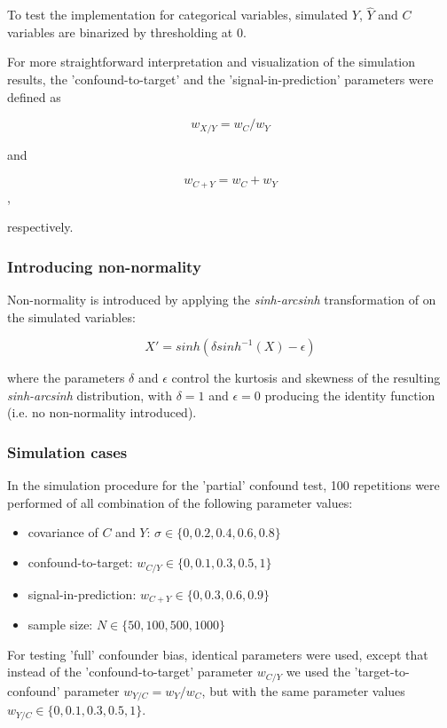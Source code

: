 \documentclass{article}
\begin{document}
To test the implementation for categorical variables, simulated $Y$, $\hat{Y}$ and $C$ variables are binarized by thresholding at 0.

For more straightforward interpretation and visualization of the simulation results, the 'confound-to-target' and the 'signal-in-prediction' parameters were defined as

$$ w_{X/Y} = w_C / w_Y $$

and

$$ w_{C+Y} = w_C + w_Y $$,

respectively.

\subsubsection*{Introducing non-normality}

Non-normality is introduced by applying the \emph{sinh-arcsinh} transformation of \cite{jones2009sinh} on the simulated variables:

$$X' = sinh(\delta sinh^{-1}(X) - \epsilon)$$

where the parameters $\delta$ and $\epsilon$ control the kurtosis and skewness of the resulting \emph{sinh-arcsinh} distribution, with $\delta=1$ and $\epsilon=0$ producing the identity function (i.e. no non-normality introduced).

\subsubsection*{Simulation cases}

In the simulation procedure for the 'partial' confound test, 100 repetitions were performed of all combination of the following parameter values: 
\begin{itemize}
    \item covariance of $C$ and $Y$: $\sigma \in \{0, 0.2, 0.4, 0.6, 0.8\}$
    \item confound-to-target: $w_{C/Y} \in \{0, 0.1, 0.3, 0.5, 1\}$
    \item signal-in-prediction: $w_{C+Y} \in \{0, 0.3, 0.6, 0.9\}$
    \item sample size: $N \in \{50, 100, 500, 1000\}$
\end{itemize}

For testing 'full' confounder bias, identical parameters were used, except that instead of the 'confound-to-target' parameter $ w_{C/Y}$ we used the 'target-to-confound' parameter $ w_{Y/C} = w_Y / w_C $, but with the same parameter values $w_{Y/C} \in \{0, 0.1, 0.3, 0.5, 1\}$.
\end{document}

